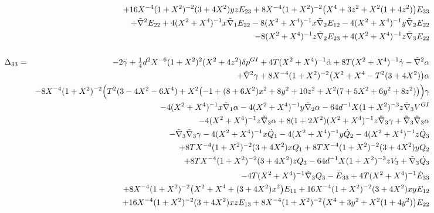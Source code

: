 \documentclass[10pt,letterpaper]{article}
\numberwithin{equation}{section}
\begin{document}
\begin{eqnarray}
&& + 16 X^{-4} (1 + X^2)^{-2} (3 + 4 X^2) y z E_{23} + 8 X^{-4} (1 + X^2)^{-2} \bigl(X^4 + 3 z^2 + X^2 (1 + 4 z^2)\bigr) E_{33} \nonumber \\ 
&& + \tilde{\nabla}^{2}E_{22} + 4 (X^2 + X^4)^{-1} x \tilde{\nabla}_{1}E_{22} - 8 (X^2 + X^4)^{-1} x \tilde{\nabla}_{2}E_{12} - 4 (X^2 + X^4)^{-1} y \tilde{\nabla}_{2}E_{22} \nonumber \\ 
&& - 8 (X^2 + X^4)^{-1} z \tilde{\nabla}_{2}E_{23} + 4 (X^2 + X^4)^{-1} z \tilde{\nabla}_{3}E_{22}
\\  \nonumber\\ 
\Delta_{33}&=& -2 \overset{..}{\gamma} + \tfrac{1}{4} d^2 X^{-6} (1 + X^2)^2 (X^2 + 4 z^2) \delta p^{GI}{} + 4 T (X^2 + X^4)^{-1} \dot{\alpha} + 8 T (X^2 + X^4)^{-1} \dot{\gamma} -  \tilde{\nabla}^{2}\alpha \nonumber \\ 
&& + \tilde{\nabla}^{2}\gamma + 8 X^{-4} (1 + X^2)^{-2} \bigl(X^2 + X^4 -  T^2 (3 + 4 X^2)\bigr) \alpha \nonumber \\ 
&& - 8 X^{-4} (1 + X^2)^{-2} \Bigl(T^2 (3 - 4 X^2 - 6 X^4) + X^2 \bigl(-1 + (8 + 6 X^2) x^2 + 8 y^2 + 10 z^2 + X^2 (7 + 5 X^2 + 6 y^2 + 8 z^2)\bigr)\Bigr) \gamma \nonumber \\ 
&& - 4 (X^2 + X^4)^{-1} x \tilde{\nabla}_{1}\alpha - 4 (X^2 + X^4)^{-1} y \tilde{\nabla}_{2}\alpha - 64 d^{-1} X (1 + X^2)^{-3} z \tilde{\nabla}_{3}V^{GI}{} \nonumber \\ 
&& - 4 (X^2 + X^4)^{-1} z \tilde{\nabla}_{3}\alpha + 8 (1 + 2 X^2) (X^2 + X^4)^{-1} z \tilde{\nabla}_{3}\gamma + \tilde{\nabla}_{3}\tilde{\nabla}_{3}\alpha \nonumber \\ 
&& -  \tilde{\nabla}_{3}\tilde{\nabla}_{3}\gamma -4 (X^2 + X^4)^{-1} x \dot{Q}_{1} - 4 (X^2 + X^4)^{-1} y \dot{Q}_{2} - 4 (X^2 + X^4)^{-1} z \dot{Q}_{3} \nonumber \\ 
&& + 8 T X^{-4} (1 + X^2)^{-2} (3 + 4 X^2) x Q_{1} + 8 T X^{-4} (1 + X^2)^{-2} (3 + 4 X^2) y Q_{2} \nonumber \\ 
&& + 8 T X^{-4} (1 + X^2)^{-2} (3 + 4 X^2) z Q_{3} - 64 d^{-1} X (1 + X^2)^{-3} z V_{3} + \tilde{\nabla}_{3}\dot{Q}_{3} \nonumber \\ 
&& - 4 T (X^2 + X^4)^{-1} \tilde{\nabla}_{3}Q_{3}- \overset{..}{E}_{33} + 4 T (X^2 + X^4)^{-1} \dot{E}_{33} \nonumber \\ 
&& + 8 X^{-4} (1 + X^2)^{-2} \bigl(X^2 + X^4 + (3 + 4 X^2) x^2\bigr) E_{11} + 16 X^{-4} (1 + X^2)^{-2} (3 + 4 X^2) x y E_{12} \nonumber \\ 
&& + 16 X^{-4} (1 + X^2)^{-2} (3 + 4 X^2) x z E_{13} + 8 X^{-4} (1 + X^2)^{-2} \bigl(X^4 + 3 y^2 + X^2 (1 + 4 y^2)\bigr) E_{22} \nonumber \\ 

\end{eqnarray}
\end{document}
